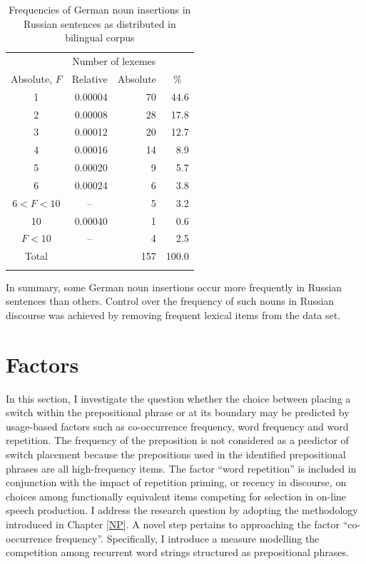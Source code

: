 \begin{table}
\begin{tabular}{crrr}
\lsptoprule
    \multicolumn{2}{c}{Word frequency} & \multicolumn{2}{c}{Number of lexemes}\\\cmidrule(lr){1-2}\cmidrule(lr){3-4}
	Absolute, $F$ & Relative & \multicolumn{1}{c}{Absolute} & \multicolumn{1}{c}{\%} \\\midrule
		1	& 0.00004	& 70	& 44.6\\
		2	& 0.00008	& 28	& 17.8\\
		3	& 0.00012	& 20	& 12.7\\
		4	& 0.00016	& 14	& 8.9\\
		5	& 0.00020	& 9	& 5.7\\
		6	& 0.00024	& 6	& 3.8\\
		$6 < F < 10$ &	\multicolumn{1}{c}{--}	& 5	& 3.2\\
		10	& 0.00040	& 1	& 0.6\\
		$F < 10$	& \multicolumn{1}{c}{--}	& 4	& 2.5\\
		Total	& 	& 157	& 100.0\\  
	\lspbottomrule
\end{tabular}
	\caption{Frequencies of German noun insertions in Russian sentences as distributed in bilingual corpus\label{tab:5:1}}
\end{table} 

In summary, some German noun insertions occur more frequently in Russian sentences than others. Control over the frequency of such nouns in Russian discourse was achieved by removing frequent lexical items from the data set.

\section{Factors}\label{sec:factors PP}

In this section, I investigate the question whether the choice between placing a switch within the prepositional phrase or at its boundary may be predicted by usage-based factors such as co-occurrence frequency, word frequency and word repetition. The frequency of the preposition is not considered as a predictor of switch placement because the prepositions used in the identified prepositional phrases are all high-frequency items. The factor “word repetition” is included in conjunction with the impact of repetition priming, or recency in discourse, on choices among functionally equivalent items competing for selection in on-line speech production. I address the research question by adopting the methodology introduced in Chapter \ref{NP}. A novel step pertains to approaching the factor “co-occurrence frequency”. Specifically, I introduce a measure modelling the competition among recurrent word strings structured as prepositional phrases.

